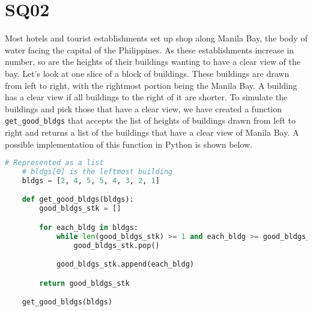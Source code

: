 \documentclass{article}
\begin{document}
\section{SQ02}

Most hotels and tourist establishments set up shop along Manila Bay, the body of water facing the capital of the Philippines. 
As these establishments increase in number, so are the heights of their buildings wanting to have a clear view of the bay. 
Let's look at one slice of a block of buildings. These buildings are drawn from left to right, with the rightmost portion being the Manila Bay. 
A building has a clear view if all buildings to the right of it are shorter. To simulate the buildings and pick those that have a clear 
view, we have created a function \texttt{get\_good\_bldgs} that accepts the list of heights of buildings drawn from left to right and returns a 
list of the buildings that have a clear view of Manila Bay. A possible implementation of this function in Python is shown below.

\begin{lstlisting}[language=Python, breaklines=true]
    # Represented as a list
    # bldgs[0] is the leftmost building
    bldgs = [2, 4, 5, 5, 4, 3, 2, 1]

    def get_good_bldgs(bldgs):
        good_bldgs_stk = []

        for each_bldg in bldgs:
            while len(good_bldgs_stk) >= 1 and each_bldg >= good_bldgs_stk[-1]:
                good_bldgs_stk.pop()

            good_bldgs_stk.append(each_bldg)

        return good_bldgs_stk

    get_good_bldgs(bldgs)
\end{lstlisting}
\end{document}
